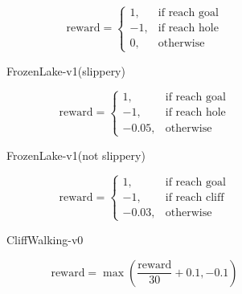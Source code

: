 \documentclass{article}
\begin{document}
\begin{figure}[h]
    \centering
    \begin{subfigure}{0.45\columnwidth}
        \centering
        \begin{equation}
            \text{reward} = \begin{cases}
                1, & \text{if reach goal} \\
                -1, & \text{if reach hole} \\
                0, & \text{otherwise}
            \end{cases} \nonumber
        \end{equation}
        \caption{FrozenLake-v1(slippery)}
        \label{fig:reward_shaping_lake_slippery}
    \end{subfigure}
    \begin{subfigure}{0.45\columnwidth}
        \centering
        \begin{equation}
            \text{reward} = \begin{cases}
                1, & \text{if reach goal} \\
                -1, & \text{if reach hole} \\
                -0.05, & \text{otherwise}
            \end{cases} \nonumber
        \end{equation}
        \caption{FrozenLake-v1(not slippery)}
        \label{fig:reward_shaping_lake_not_slippery}
    \end{subfigure}
    \begin{subfigure}{0.45\columnwidth}
        \centering
        \begin{equation}
            \text{reward} = \begin{cases}
                1, & \text{if reach goal} \\
                -1, & \text{if reach cliff} \\
                -0.03, & \text{otherwise}
            \end{cases} \nonumber
        \end{equation}
        \caption{CliffWalking-v0}
        \label{fig:reward_shaping_cliff}
    \end{subfigure}
    \begin{subfigure}{0.45\columnwidth}
        \centering
        \begin{equation}
            \text{reward} = \max\left(\frac{\text{reward}}{30} + 0.1, -0.1\right) \nonumber
        \end{equation}

\end{subfigure}
\end{figure}
\end{document}
